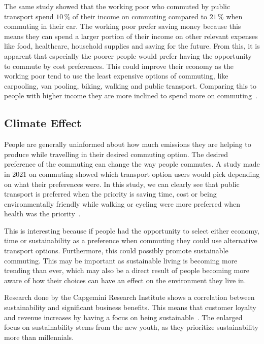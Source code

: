 The same study showed that the working poor who commuted by public transport spend \(10\,\%\) of their income on
commuting compared to \(21\,\%\) when commuting in their car.
The working poor prefer saving money because this means they can spend a larger portion of their income on other
relevant expenses like food, healthcare, household supplies and saving for the future.
From this, it is apparent that especially the poorer people would prefer having the opportunity to
commute by cost preferences.
This could improve their economy as the working poor tend to use the least expensive options of commuting, like
carpooling, van pooling, biking, walking and public transport.
Comparing this to people with higher income they are more inclined to spend more on commuting~\cite{bankrate2023}.

\subsection{Climate Effect}\label{subsec:climate-effect}

People are generally uninformed about how much emissions they are helping to produce while travelling in their
desired commuting option.
The desired preference of the commuting can change the way people commutes.
A study made in 2021 on commuting showed which transport option users would pick depending on what their preferences
were.
In this study, we can clearly see that public transport is preferred when the priority is saving time, cost or being
environmentally friendly while walking or cycling were more preferred when health was the priority~\cite{spark2023}.

This is interesting because if people had the opportunity to select either economy, time or sustainability as a
preference when commuting they could use alternative transport options.
Furthermore, this could possibly promote sustainable commuting.
This may be important as sustainable living is becoming more trending than ever, which may also be a direct result of
people becoming more aware of how their choices can have an effect on the environment they live in.

Research done by the Capgemini Research Institute shows a correlation between sustainability and significant business
benefits.
This means that customer loyalty and revenue increases by having a focus on being sustainable~\cite{capgemini2020}.
The enlarged focus on sustainability stems from the new youth, as they prioritize sustainability more than millennials.

